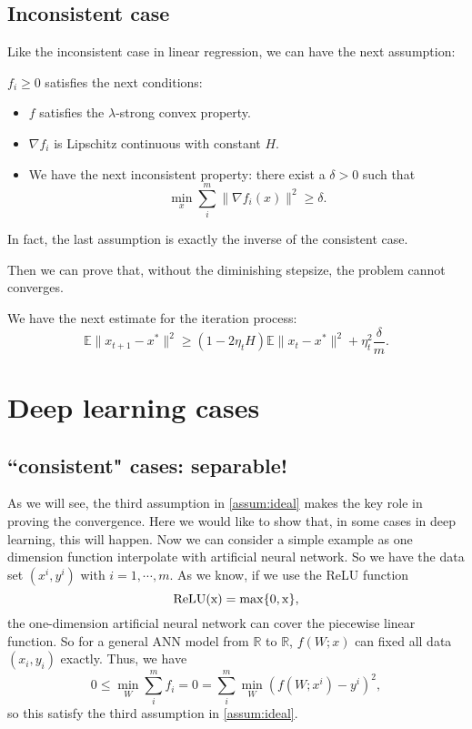 \subsection{Inconsistent case}
Like the inconsistent case in linear regression, we can have the next assumption:
\begin{assumption}\label{assum:inconsistent}
	$f_i \ge 0$ satisfies the next conditions:
	\begin{itemize}
		\item $ f$ satisfies the $\lambda$-strong convex property.
		\item $\nabla f_i$ is Lipschitz continuous with constant $H$.
		\item We have the next inconsistent property: there exist a $\delta > 0$ such that 
		\begin{equation}
		\min_{x } \sum_i^m \|\nabla f_i(x)\|^2 \ge \delta.
		\end{equation}
	\end{itemize}
	In fact, the last assumption is exactly the inverse of the consistent case. 
\end{assumption}
Then we can prove that, without the diminishing stepsize, the problem cannot converges.
\begin{theorem}
	We have the next estimate for the iteration process:
	\begin{equation}
	\mathbb{E}\|x_{t+1} - x^*\|^2 \ge (1 - 2\eta_t H)\mathbb{E} \|x_t - x^*\|^2 + \eta_t^2 \frac{\delta}{m}.
	\end{equation}
\end{theorem}



\section{Deep learning cases}
\subsection{``consistent" cases: separable!}
As we will see, the third assumption in \ref{assum:ideal} makes the key role in proving the convergence. Here we would like to show that, in some cases in deep learning, this will happen. Now we can consider a simple example as one dimension function interpolate with artificial neural network. So we have the data set $(x^i, y^i)$ with $i = 1, \cdots, m$. As we know, if we use the ReLU function 
\begin{equation}
\rm{ReLU}(x) = \max\{0,x\},
\end{equation} 
the one-dimension artificial neural network can cover the piecewise linear function. So for a general ANN model from $\mathbb{R}$ to $\mathbb{R}$, $f(W;x)$ can fixed all data $(x_i, y_i)$ exactly. Thus, we have 
\begin{equation}
0 \le \min_W \sum_i^m f_i = 0 = \sum_i^m \min_W (f(W;x^i) - y^i)^2,
\end{equation}
so this satisfy the third assumption in \ref{assum:ideal}.

